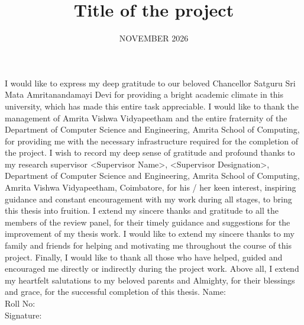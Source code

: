\documentclass[MTech]{ugthesis}
\begin{document}

\title{Title of the project } %
\firstauthorregno{[CB.SC.P2CSE25001]}
\date{ NOVEMBER 2026} %

\maketitle
\certificate
\acknowledgements
\normalfont
I would like to express my deep gratitude to our beloved Chancellor Satguru Sri Mata Amritanandamayi Devi for providing a bright academic climate in this university, which has made this entire task appreciable. I would like to thank the management of Amrita Vishwa Vidyapeetham and the entire fraternity of the Department of Computer Science and Engineering, Amrita School of Computing, for providing me with the necessary infrastructure required for the completion of the project. 
I wish to record my deep sense of gratitude and profound thanks to my research supervisor <Supervisor Name>, <Supervisor Designation>, Department of Computer Science and Engineering, Amrita School of Computing, Amrita Vishwa Vidyapeetham, Coimbatore, for his / her keen interest, inspiring guidance and constant encouragement with my work during all stages, to bring this thesis into fruition. 
I extend my sincere thanks and gratitude to all the members of the review panel, for their timely guidance and suggestions for the improvement of my thesis work.
I would like to extend my sincere thanks to my family and friends for helping and motivating me throughout the course of this project. 
Finally, I would like to thank all those who have helped, guided and encouraged me directly or indirectly during the project work. 
Above all, I extend my heartfelt salutations to my beloved parents and Almighty, for their blessings and grace, for the successful completion of this thesis.
\vskip 25pt
\noindent
Name:\\ 
Roll No:\\
Signature:\\
\end{document}
